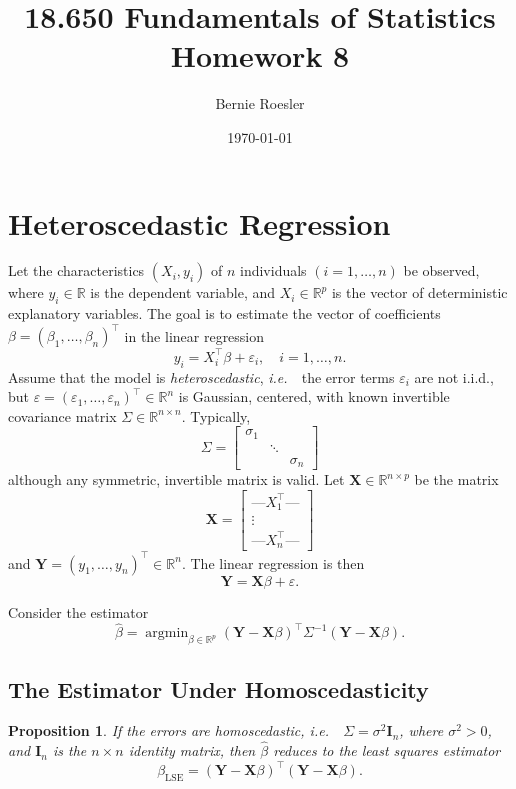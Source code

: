 \documentclass[letterpaper, reqno]{amsart}
\title[Homework 8 -- Problem \thesection]{18.650 Fundamentals of Statistics\\{\large Homework 8}}
\author{Bernie Roesler}
\date{\today}
\newtheorem{prop}{Proposition}[section]
\numberwithin{equation}{section}
\newcommand{\T}{\top} %
\newcommand{\vect}[1]{\boldsymbol{\mathbf{#1}}} %
\newcommand{\ie}{\emph{i.e.\ }}
\newcommand{\R}{\mathbb{R}}  %
\newcommand{\iid}{i.i.d.}
\newcommand{\Xm}{\vect{X}}
\newcommand{\Yv}{\vect{Y}}
\newcommand{\Bv}{\beta}
\newcommand{\Bvh}{\hat{\beta}}
\newcommand{\ve}{\varepsilon}
\DeclareMathOperator*{\argmin}{argmin}
\begin{document}
\graphicspath{{./figures/}}

\maketitle

\section{Heteroscedastic Regression}
Let the characteristics $(X_i, y_i)$ of $n$ individuals $(i = 1, \dots, n)$ be
observed, where $y_i \in \R$ is the dependent variable, and $X_i \in \R^p$ is
the vector of deterministic explanatory variables. The goal is to estimate the
vector of coefficients $\Bv = (\beta_1, \dots, \beta_n)^\T$ in the linear
regression
\[ y_i = X_i^\T \Bv + \ve_i, \quad i = 1, \dots, n. \]
Assume that the model is \emph{heteroscedastic}, \ie\ the error terms $\ve_i$
are not \iid, but $\ve = (\ve_1, \dots, \ve_n)^\T \in \R^n$ is Gaussian,
centered, with known invertible covariance matrix $\Sigma \in \R^{n \times n}$.
Typically,
\[ \Sigma = \begin{bmatrix} \sigma_1 && \\ & \ddots & \\ && \sigma_n \end{bmatrix} \]
although any symmetric, invertible matrix is valid.
Let $\Xm \in \R^{n \times p}$ be the matrix
\[ \Xm = \begin{bmatrix} 
            \text{---} X_1^\T \text{---} \\
            \vdots \\ 
            \text{---} X_n^\T \text{---} 
          \end{bmatrix} 
\]
and $\Yv = (y_1, \dots, y_n)^\T \in \R^n$.
The linear regression is then
\[ \Yv = \Xm\Bv + \ve. \]

Consider the estimator
\[ \Bvh = \argmin_{\Bv \in \R^p} (\Yv - \Xm\Bv)^\T \Sigma^{-1} (\Yv - \Xm\Bv). \]

\subsection{The Estimator Under Homoscedasticity}
\begin{prop}
  If the errors are homoscedastic, \ie\ $\Sigma = \sigma^2 \vect{I}_n$, where $\sigma^2 > 0$, and
  $\vect{I}_n$ is the $n \times n$ identity matrix, then $\Bvh$ reduces to the least
  squares estimator
  \[ \beta_\mathrm{LSE} = (\Yv - \Xm\Bv)^\T(\Yv - \Xm\Bv). \]
\end{prop}
\end{document}
